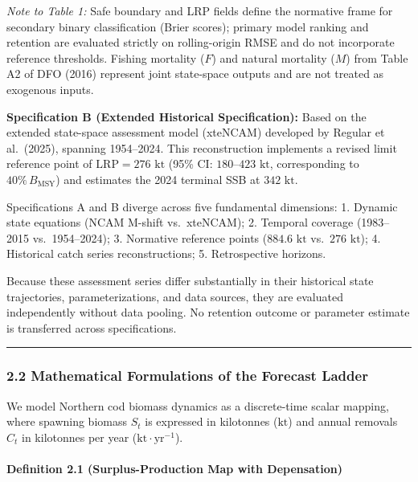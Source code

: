 \documentclass[11pt]{article}
\begin{document}
\emph{Note to Table 1:} Safe boundary and LRP fields define the
normative frame for secondary binary classification (Brier scores);
primary model ranking and retention are evaluated strictly on
rolling-origin RMSE and do not incorporate reference thresholds. Fishing
mortality (\(F\)) and natural mortality (\(M\)) from Table A2 of DFO
(2016) represent joint state-space outputs and are not treated as
exogenous inputs.

\textbf{Specification B (Extended Historical Specification):} Based on
the extended state-space assessment model (xteNCAM) developed by Regular
et al.~(2025), spanning 1954--2024. This reconstruction implements a
revised limit reference point of \(\mathrm{LRP} = 276\text{ kt}\) (95\%
CI: \(180\text{--}423\text{ kt}\), corresponding to
\(40\%\,B_{\mathrm{MSY}}\)) and estimates the 2024 terminal SSB at
\(342\text{ kt}\).

Specifications A and B diverge across five fundamental dimensions: 1.
Dynamic state equations (NCAM M-shift vs.~xteNCAM); 2. Temporal coverage
(1983--2015 vs.~1954--2024); 3. Normative reference points
(\(884.6\text{ kt}\) vs.~\(276\text{ kt}\)); 4. Historical catch series
reconstructions; 5. Retrospective horizons.

Because these assessment series differ substantially in their historical
state trajectories, parameterizations, and data sources, they are
evaluated independently without data pooling. No retention outcome or
parameter estimate is transferred across specifications.

\begin{center}\rule{0.5\linewidth}{0.5pt}\end{center}

\subsubsection{2.2 Mathematical Formulations of the Forecast
Ladder}\label{mathematical-formulations-of-the-forecast-ladder}

We model Northern cod biomass dynamics as a discrete-time scalar
mapping, where spawning biomass \(S_t\) is expressed in kilotonnes
(\(\text{kt}\)) and annual removals \(C_t\) in kilotonnes per year
(\(\text{kt}\cdot\text{yr}^{-1}\)).

\paragraph{Definition 2.1 (Surplus-Production Map with
Depensation)}\label{definition-2.1-surplus-production-map-with-depensation}
\end{document}
